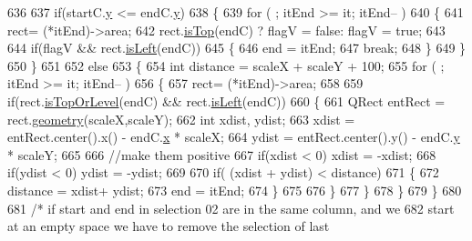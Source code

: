 \begin{DoxyCode}
636 
637         \textcolor{keywordflow}{if}(startC.\hyperlink{classOkular_1_1NormalizedPoint_ac2276daabda627d5f82bb1532c293047}{y} <= endC.\hyperlink{classOkular_1_1NormalizedPoint_ac2276daabda627d5f82bb1532c293047}{y})
638         \{
639             \textcolor{keywordflow}{for} ( ; itEnd >= it; itEnd-- )
640             \{
641                 rect= (*itEnd)->area;
642                 rect.\hyperlink{classOkular_1_1NormalizedRect_a415ad207e347970f0406989dfcbf1b1b}{isTop}(endC) ? flagV = \textcolor{keyword}{false}: flagV = \textcolor{keyword}{true};
643 
644                 \textcolor{keywordflow}{if}(flagV && rect.\hyperlink{classOkular_1_1NormalizedRect_a8024acae1abfdb0765bd205df7efbfe3}{isLeft}(endC))
645                 \{
646                     end = itEnd;
647                     \textcolor{keywordflow}{break};
648                 \}
649             \}
650         \}
651 
652         \textcolor{keywordflow}{else}
653         \{
654             \textcolor{keywordtype}{int} distance = scaleX + scaleY + 100;
655             \textcolor{keywordflow}{for} ( ; itEnd >= it; itEnd-- )
656             \{
657                 rect= (*itEnd)->area;
658 
659                 \textcolor{keywordflow}{if}(rect.\hyperlink{classOkular_1_1NormalizedRect_a0d525438d22d8b2ec76d054e1921b4e1}{isTopOrLevel}(endC) && rect.\hyperlink{classOkular_1_1NormalizedRect_a8024acae1abfdb0765bd205df7efbfe3}{isLeft}(endC))
660                 \{
661                     QRect entRect = rect.\hyperlink{classOkular_1_1NormalizedRect_a006897c5fcff2c3a97b4141f1a967513}{geometry}(scaleX,scaleY);
662                     \textcolor{keywordtype}{int} xdist, ydist;
663                     xdist = entRect.center().x() - endC.\hyperlink{classOkular_1_1NormalizedPoint_a857f49b9bc7712430d167472ef9dbd94}{x} * scaleX;
664                     ydist = entRect.center().y() - endC.\hyperlink{classOkular_1_1NormalizedPoint_ac2276daabda627d5f82bb1532c293047}{y} * scaleY;
665 
666                     \textcolor{comment}{//make them positive}
667                     \textcolor{keywordflow}{if}(xdist < 0) xdist = -xdist;
668                     \textcolor{keywordflow}{if}(ydist < 0) ydist = -ydist;
669 
670                     \textcolor{keywordflow}{if}( (xdist + ydist) < distance)
671                     \{
672                         distance = xdist+ ydist;
673                         end = itEnd;
674                     \}
675 
676                 \}
677             \}
678         \}
679     \}
680 
681     \textcolor{comment}{/* if start and end in selection 02 are in the same column, and we}
682 \textcolor{comment}{     start at an empty space we have to remove the selection of last}

\end{DoxyCode}
